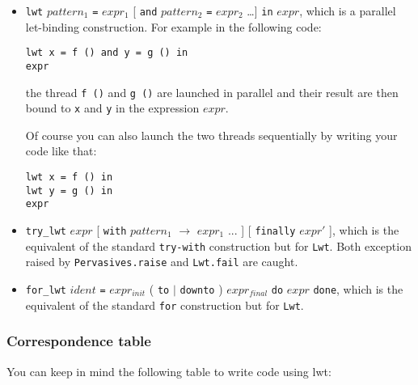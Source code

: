 \documentclass{article}
\newcommand{\lwt}{\texttt{Lwt}\xspace}
\begin{document}
\begin{itemize}
\item \texttt{lwt} $pattern_1$ \texttt{=} $expr_1$ [ \texttt{and}
  $pattern_2$ \texttt{=} $expr_2$ \dots ] \texttt{in} $expr$, which is a
  parallel let-binding construction. For example in the following
  code:

\begin{verbatim}
lwt x = f () and y = g () in
expr
\end{verbatim}

  the thread \texttt{f ()} and \texttt{g ()} are launched in parallel
  and their result are then bound to \texttt{x} and \texttt{y} in the
  expression $expr$.

  Of course you can also launch the two threads sequentially by
  writing your code like that:

\begin{verbatim}
lwt x = f () in
lwt y = g () in
expr
\end{verbatim}

\item \texttt{try\_lwt} $expr$ [ \texttt{with} $pattern_1$
  \texttt{$\rightarrow$} $expr_1$ ... ] [ \texttt{finally} $expr'$ ],
  which is the equivalent of the standard \texttt{try-with}
  construction but for \lwt. Both exception raised by
  \texttt{Pervasives.raise} and \texttt{Lwt.fail} are caught.

\item \texttt{for\_lwt} $ident$ \texttt{=} $expr_{init}$ ( \texttt{to}
  $\mid$ \texttt{downto} ) $expr_{final}$ \texttt{do} $expr$
  \texttt{done}, which is the equivalent of the standard \texttt{for}
  construction but for \lwt.
\end{itemize}

\subsubsection{Correspondence table}

You can keep in mind the following table to write code using lwt:
\end{document}
